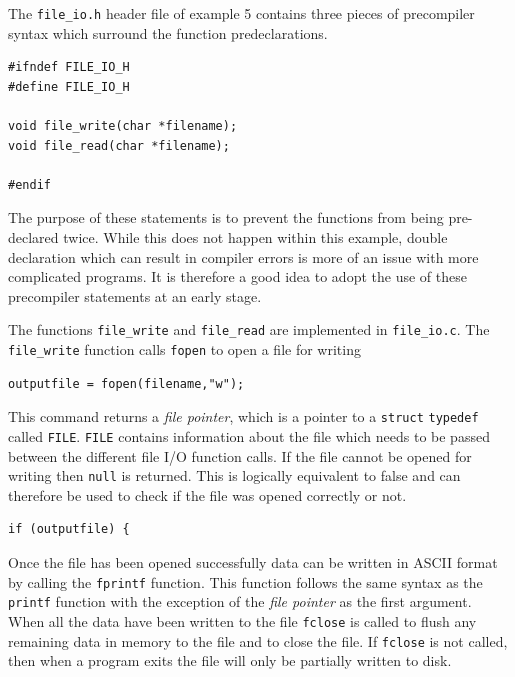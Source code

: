 \documentclass[11pt]{scrartcl}
\begin{document}
The \texttt{file\_io.h} header file of example 5 contains three pieces
of precompiler syntax which surround the function predeclarations.
\begin{lstlisting}
#ifndef FILE_IO_H
#define FILE_IO_H

void file_write(char *filename);
void file_read(char *filename);

#endif
\end{lstlisting} %
The purpose of these statements is to prevent the functions from being
pre-declared twice.  While this does not happen within this example,
double declaration which can result in compiler errors is more of an
issue with more complicated programs.  It is therefore a good idea to
adopt the use of these precompiler statements at an early stage. 

The functions \texttt{file\_write} and \texttt{file\_read} are
implemented in \texttt{file\_io.c}.  The \texttt{file\_write} function
calls \texttt{fopen} to open a file for writing
\begin{lstlisting}
outputfile = fopen(filename,"w");
\end{lstlisting}
This command returns a {\em file pointer}, which is a pointer to a
\texttt{struct} \texttt{typedef} called \texttt{FILE}.  \texttt{FILE}
contains information about the file which needs to be passed between
the different file I/O function calls.  If the file cannot be opened
for writing then \texttt{null} is returned.  This is logically
equivalent to false and can therefore be used to check if the file was
opened correctly or not.
\begin{lstlisting}
if (outputfile) {
\end{lstlisting}
Once the file has been opened successfully data can be written in
ASCII format by calling the \texttt{fprintf} function.  This function
follows the same syntax as the \texttt{printf} function with the
exception of the {\em file pointer} as the first argument.  When all
the data have been written to the file \texttt{fclose} is called to
flush any remaining data in memory to the file and to close the file.
If \texttt{fclose} is not called, then when a program exits the file will
only be partially written to disk.
\end{document}

